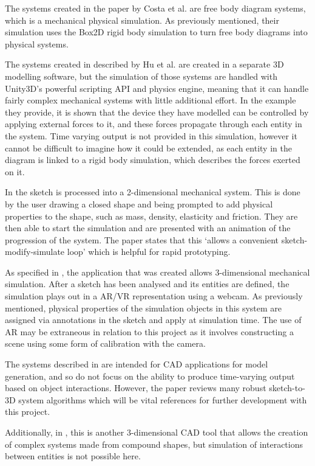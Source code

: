\documentclass{article}
\begin{document}
The systems created in the paper by Costa et al. \cite{109781I} are free body diagram systems, which is a
mechanical physical simulation. As previously mentioned, their simulation uses the Box2D rigid body simulation
to turn free body diagrams into physical systems. 

The systems created in \cite{6274802} described by Hu et al. are created in a separate 3D modelling software, but the 
simulation of those systems are handled with Unity3D's powerful scripting API and physics engine, meaning that it can 
handle fairly complex mechanical systems with little additional effort. In the example they provide, it is shown that
the device they have modelled can be controlled by applying external forces to it, and these forces propagate through
each entity in the system. Time varying output is not provided in this simulation, however it cannot be difficult to 
imagine how it could be extended, as each entity in the diagram is linked to a rigid body simulation, which describes
the forces exerted on it.

In \cite{5460522} the sketch is processed into a 2-dimensional mechanical system. This is done by the user drawing a closed shape 
and being prompted to add physical properties to the shape, such as mass, density, elasticity and friction. They are
then able to start the simulation and are presented with an animation of the progression of the system. The paper states
that this `allows a convenient sketch-modify-simulate loop' which is helpful for rapid prototyping.

As specified in \cite{5336490}, the application that was created allows 3-dimensional mechanical simulation. After a sketch has been
analysed and its entities are defined, the simulation plays out in a \gls{AR}/\gls{VR} representation using a webcam. As previously mentioned, 
physical properties of the simulation objects in this system are assigned via annotations in the sketch and apply at simulation time.
The use of \gls{AR} may be extraneous in relation to this project as it involves constructing a scene using some form of calibration
with the camera.

The systems described in \cite{101017S} are intended for \gls{CAD} applications for model generation, and so do not focus on the ability to
produce time-varying output based on object interactions. However, the paper reviews many robust sketch-to-3D system 
algorithms which will be vital references for further development with this project.

Additionally, in \cite{4722231}, this is another 3-dimensional \gls{CAD} tool that allows the creation of complex systems made from 
compound shapes, but simulation of interactions between entities is not possible here. 
\end{document}
